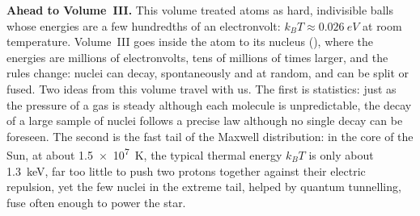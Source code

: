 \medskip
\textbf{Ahead to Volume~III.} This volume treated atoms as hard, indivisible balls whose energies are a
few hundredths of an electronvolt: $k_BT\approx\SI{0.026}{eV}$ at room temperature. Volume~III goes inside
the atom to its nucleus (), where the energies are millions of electronvolts, tens of
millions of times larger, and the rules change: nuclei can decay, spontaneously and at random, and can be
split or fused. Two ideas from this volume travel with us. The first is statistics: just as the pressure
of a gas is steady although each molecule is unpredictable, the decay of a large sample of nuclei follows a
precise law although no single decay can be foreseen. The second is the fast tail of the Maxwell
distribution: in the core of the Sun, at about \SI{1.5e7}{K}, the typical thermal energy $k_BT$ is only
about \SI{1.3}{keV}, far too little to push two protons together against their electric repulsion, yet
the few nuclei in the extreme tail, helped by quantum tunnelling, fuse often enough to power the star.
